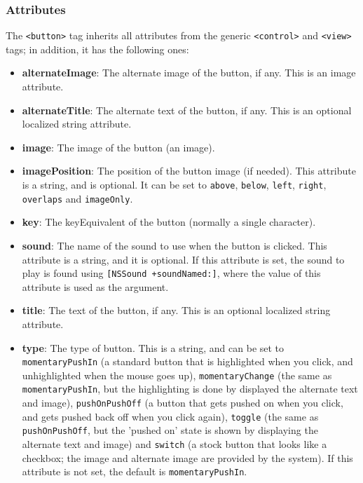\subsubsection{Attributes}
The \texttt{<button>} tag inherits all attributes from the generic
\texttt{<control>} and \texttt{<view>} tags; in addition, it has 
the following ones:
\begin{itemize}
\item {\bf alternateImage}: The alternate image of the button, if any.
  This is an image attribute.
\item {\bf alternateTitle}: The alternate text of the button, if any.
  This is an optional localized string attribute.
\item {\bf image}: The image of the button (an image).
\item {\bf imagePosition}: The position of the button image (if
  needed).  This attribute is a string, and is optional.  It can be
  set to \texttt{above}, \texttt{below}, \texttt{left},
  \texttt{right}, \texttt{overlaps} and \texttt{imageOnly}.
\item {\bf key}: The keyEquivalent of the button (normally a single
  character).
\item {\bf sound}: The name of the sound to use when the button is
  clicked.  This attribute is a string, and it is optional.  If this
  attribute is set, the sound to play is found using \texttt{[NSSound
  +soundNamed:]}, where the value of this attribute is used as the
  argument.
\item {\bf title}: The text of the button, if any.  This is an
  optional localized string attribute.
\item {\bf type}: The type of button.  This is a string, and can be
  set to \texttt{momentaryPushIn} (a standard button that is
  highlighted when you click, and unhighlighted when the mouse goes
  up), \texttt{momentaryChange} (the same as \texttt{momentaryPushIn},
  but the highlighting is done by displayed the alternate text and
  image), \texttt{pushOnPushOff} (a button that gets pushed on when
  you click, and gets pushed back off when you click again),
  \texttt{toggle} (the same as \texttt{pushOnPushOff}, but the 'pushed
  on' state is shown by displaying the alternate text and image) and
  \texttt{switch} (a stock button that looks like a checkbox; the
  image and alternate image are provided by the system).  If this
  attribute is not set, the default is \texttt{momentaryPushIn}.
\end{itemize}


